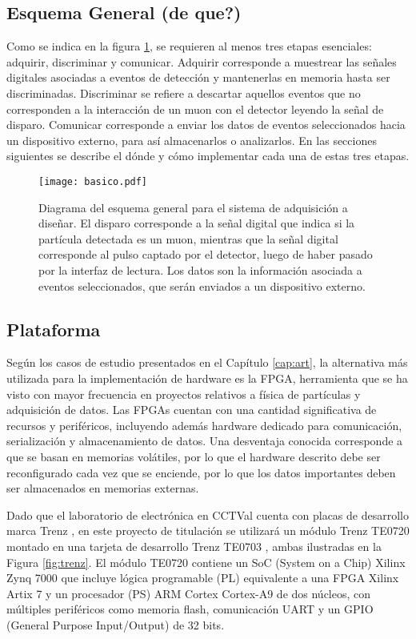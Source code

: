 	\subsection{Esquema General (de que?)}
		Como se indica en la figura \ref{img:diagrama}, se requieren al menos tres etapas esenciales: adquirir, discriminar y comunicar. Adquirir corresponde a muestrear las señales digitales asociadas a eventos de detección y mantenerlas en memoria hasta ser discriminadas. Discriminar se refiere a descartar aquellos eventos que no corresponden a la interacción de un muon con el detector leyendo la señal de disparo. Comunicar corresponde a enviar los datos de eventos seleccionados hacia un dispositivo externo, para así almacenarlos o analizarlos. En las secciones siguientes se describe el dónde y cómo implementar cada una de estas tres etapas.
		
		\begin{figure}[h]
			\centering
			\texttt{[image: basico.pdf]}
			\caption{Diagrama del esquema general para el sistema de adquisición a diseñar. El disparo corresponde a la señal digital que indica si la partícula detectada es un muon, mientras que la señal digital corresponde al pulso captado por el detector, luego de haber pasado por la interfaz de lectura. Los datos son la información asociada a eventos seleccionados, que serán enviados a un dispositivo externo.}
			\label{img:diagrama}
		\end{figure}
	
	\subsection{Plataforma}
		Según los casos de estudio presentados en el Capítulo \ref{cap:art}, la alternativa más utilizada para la implementación de hardware  es la FPGA, herramienta que se ha visto con mayor frecuencia en proyectos relativos a física de partículas y adquisición de datos. Las FPGAs cuentan con una cantidad significativa de recursos y periféricos, incluyendo además hardware dedicado para comunicación, serialización y almacenamiento de datos. Una desventaja conocida corresponde a que se basan en memorias volátiles, por lo que el hardware descrito debe ser reconfigurado cada vez que se enciende, por lo que los datos importantes deben ser almacenados en memorias externas.
		
		Dado que el laboratorio de electrónica en CCTVal cuenta con placas de desarrollo marca Trenz , en este proyecto de titulación se utilizará un módulo Trenz TE0720 \cite{TrenzElectronic2020TE0720Wiki} montado en una tarjeta de desarrollo Trenz TE0703 \cite{TrenzElectronic2019TE0703Wiki}, ambas ilustradas en la Figura \ref{fig:trenz}. El módulo TE0720 contiene un SoC (System on a Chip) Xilinx Zynq 7000 \cite{Xilinx2012Zynq-7000Architecture} que incluye lógica programable (PL) equivalente a una FPGA Xilinx Artix 7\cite{Xilinx20107DS180} y un procesador (PS) ARM Cortex Cortex-A9 de dos núcleos, con múltiples periféricos como memoria flash, comunicación UART y un GPIO (General Purpose Input/Output) de 32 bits.
		
